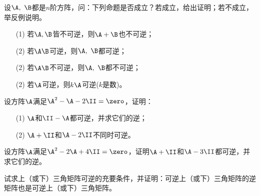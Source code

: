 \begin{frame}
  \begin{footnotesize}
    \begin{exampleblock}{44}
      设$\A,~\B$都是$n$阶方阵，问：下列命题是否成立？若成立，给出证明；若不成立，举反例说明。
      \begin{itemize}
      \item[(1)]若$\A,\B$皆不可逆，则$\A+\B$也不可逆；
      \item[(2)]若$\A\B$可逆，则$\A,~\B$都可逆；
      \item[(2)]若$\A\B$不可逆，则$\A,~\B$都不可逆；
      \item[(2)]若$\A$可逆，则$k\A$可逆($k$是数)。
      \end{itemize}
    \end{exampleblock}
  \end{footnotesize}
\end{frame}



\begin{frame}
  \begin{footnotesize}
    \begin{exampleblock}{45}
      设方阵$\A$满足$\A^2-\A-2\II=\zero$，证明：
      \begin{itemize}
      \item[(1)]$\A$和$\II-\A$都可逆，并求它们的逆；
      \item[(2)]$\A+\II$和$\A-2\II$不同时可逆。
      \end{itemize}
    \end{exampleblock}
  \end{footnotesize}
\end{frame}



\begin{frame}
  \begin{footnotesize}
    \begin{exampleblock}{46}
      设方阵$\A$满足$\A^2-2\A+4\II=\zero$，证明$\A+\II$和$\A-3\II$都可逆，并求它们的逆。
    \end{exampleblock}
  \end{footnotesize}
\end{frame}



\begin{frame}
  \begin{footnotesize}
    \begin{exampleblock}{47}
      试求上（或下）三角矩阵可逆的充要条件，并证明：可逆上（或下）三角矩阵的逆矩阵也是可逆上（或下）三角矩阵。
    \end{exampleblock}
  \end{footnotesize}
\end{frame}




